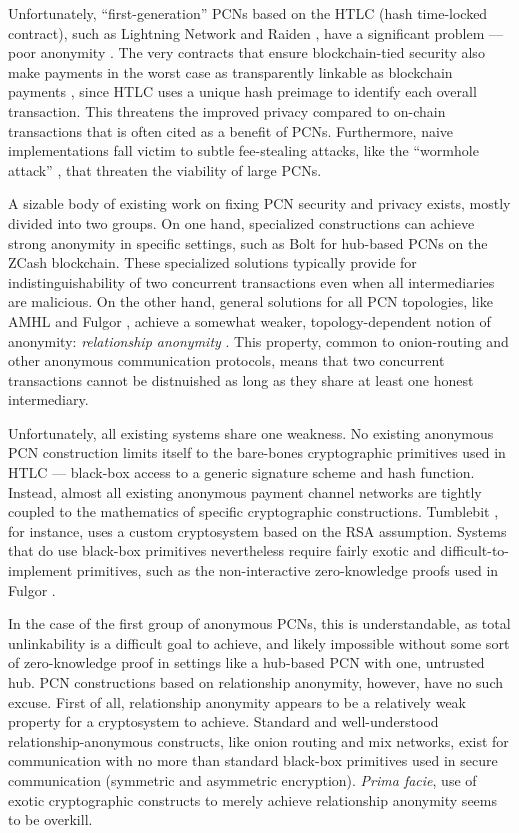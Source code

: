 \documentclass[USenglish,oneside,twocolumn]{article}
\begin{document}
Unfortunately, ``first-generation'' PCNs based on the HTLC (hash time-locked contract), such as Lightning Network \cite{decker2015fast} and Raiden \cite{raiden}, have a significant problem --- poor anonymity \cite{malavolta2017concurrency}. The very contracts that ensure blockchain-tied security also make payments in the worst case as transparently linkable as blockchain payments \cite{malavolta2017concurrency}, since HTLC uses a unique hash preimage to identify each overall transaction. This threatens the improved privacy compared to on-chain transactions that is often cited as a benefit of PCNs. Furthermore, naive implementations fall victim to subtle fee-stealing attacks, like the ``wormhole attack'' \cite{malavolta2019anonymous}, that threaten the viability of large PCNs.

A sizable body of existing work on fixing PCN security and privacy exists, mostly divided into two groups. On one hand, specialized constructions can achieve strong anonymity in specific settings, such as Bolt \cite{green2017bolt} for hub-based PCNs on the ZCash blockchain. These specialized solutions typically provide for indistinguishability of two concurrent transactions even when all intermediaries are malicious. On the other hand, general solutions for all PCN topologies, like AMHL \cite{malavolta2019anonymous} and Fulgor \cite{malavolta2017concurrency}, achieve a somewhat weaker, topology-dependent notion of anonymity: \emph{relationship anonymity} \cite{backes2013anoa}. This property, common to onion-routing and other anonymous communication protocols, means that two concurrent transactions cannot be distnuished as long as they share at least one honest intermediary.

Unfortunately, all existing systems share one weakness. No existing anonymous PCN construction limits itself to the bare-bones cryptographic primitives used in HTLC --- black-box access to a generic signature scheme and hash function. Instead, almost all existing anonymous payment channel networks are tightly coupled to the mathematics of specific cryptographic constructions. Tumblebit \cite{heilman2017tumblebit}, for instance, uses a custom cryptosystem based on the RSA assumption. Systems that do use black-box primitives nevertheless require fairly exotic and difficult-to-implement primitives, such as the non-interactive zero-knowledge proofs used in Fulgor \cite{malavolta2017concurrency}.

In the case of the first group of anonymous PCNs, this is understandable, as total unlinkability is a difficult goal to achieve, and likely impossible without some sort of zero-knowledge proof in settings like a hub-based PCN with one, untrusted hub. PCN constructions based on relationship anonymity, however, have no such excuse. First of all, relationship anonymity appears to be a relatively weak property for a cryptosystem to achieve. Standard and well-understood relationship-anonymous constructs, like onion routing and mix networks, exist for communication with no more than standard black-box primitives used in secure communication (symmetric and asymmetric encryption). \emph{Prima facie}, use of exotic cryptographic constructs to merely achieve relationship anonymity seems to be overkill.
\end{document}

